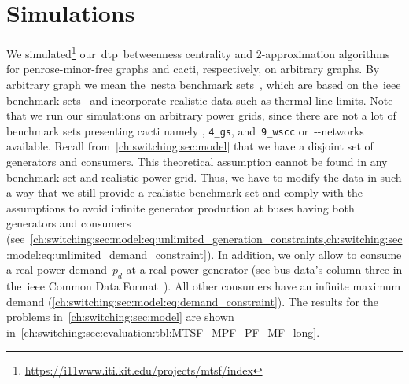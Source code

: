 \section{Simulations}  
\label{ch:switching:sec:evaluation}
% 
We simulated\footnote{\href{https://i11www.iti.kit.edu/projects/mtsf/index}{https://i11www.iti.kit.edu/projects/mtsf/index}} 
% 
our~\gls{dtp}~betweenness centrality and 2-approximation algorithms for
penrose-minor-free graphs and cacti, respectively, on arbitrary graphs.
% 
By arbitrary graph we mean the~\gls{nesta} benchmark sets~\parencite{Cof14b},
which are based on the~\gls{ieee} benchmark
% 
sets~\parencite{online:IEEEtestData,Zimmerman2011a,4075418,Bil70,online:TheUniversityOfEdinburgh:SchoolOfMathematics:PowerSystemsTestCaseArchive,crow2015computational,Dem77,Gra03,780914,
Jos16,6120344,5589973,4113721,Woo13} and 
incorporate 
% 
realistic data such as thermal line limits. Note that we run our simulations on
arbitrary power grids, since there are not a lot of benchmark sets presenting
cacti namely , \texttt{4\_gs}, and~\texttt{9\_wscc} 
% 
% 
or~\source-\sink-networks available.
% 
%
Recall from~\cref{ch:switching:sec:model} that we have a disjoint set of
generators and consumers. This theoretical assumption cannot be found in any
benchmark set and realistic power grid. Thus, we have to modify the data in such
a way that we still provide a realistic benchmark set and comply with the
assumptions to avoid infinite generator production at buses having both
generators and consumers
(see~\cref{ch:switching:sec:model:eq:unlimited_generation_constraints,ch:switching:sec:model:eq:unlimited_demand_constraint}).
In addition, we only allow to consume a real power demand~$p_d$ at a real power
generator (see bus data's column three in the~\gls{ieee} Common Data
Format~\parencite{4075293}). All other consumers have an infinite maximum demand
(\cref{ch:switching:sec:model:eq:demand_constraint}). The results for the
problems in~\cref{ch:switching:sec:model} are shown
in~\cref{ch:switching:sec:evaluation:tbl:MTSF_MPF_PF_MF_long}.

